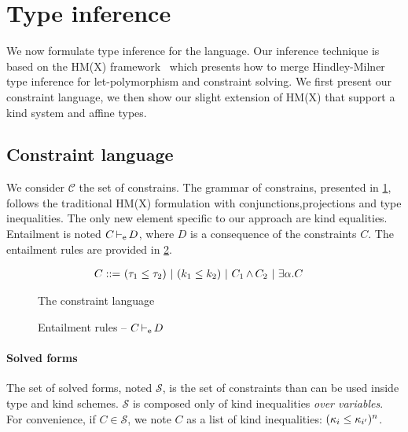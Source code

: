 \section{Type inference}

We now formulate type inference for the \lang language. Our inference technique is based on the HM(X) framework~\citep{DBLP:journals/tapos/OderskySW99} which
presents how to merge Hindley-Milner type inference for let-polymorphism and
constraint solving. We first present our constraint language, we then show
our slight extension of HM(X) that support a kind system and affine types.

\subsection{Constraint language}

We consider $\mathcal C$ the set of constrains.
The grammar of constrains, presented
in \cref{grammar:constraint}, follows the traditional HM(X) formulation
with conjunctions,projections and type inequalities. The only new
element specific to our approach are kind equalities.
Entailment is noted $C \operatorname{\vdash_e} D$, where $D$ is a consequence of the
constraints $C$. The entailment rules are provided in \cref{rules:entail}.

\begin{figure}[h]
  \centering
  \begin{align*}
    C ::=&\ (\tau_1 \leq \tau_2)\ |\ (k_1 \leq k_2)\ |\ C_1 \operatorname{\wedge} C_2\ |\ \exists \alpha.C
  \end{align*}
  \caption{The constraint language}
  \label{grammar:constraint}
\end{figure}

\begin{figure*}[h]
  
  \caption{Entailment rules -- $C \operatorname{\vdash_e} D$ }
  \label{rules:entail}
\end{figure*}


\paragraph{Solved forms}

The set of solved forms, noted $\mathcal S$,
is the set of constraints than can be used inside
type and kind schemes. $\mathcal S$ is composed only of kind
inequalities \emph{over variables}. For convenience, if $C\in\mathcal S$, we
note $C$ as a list of kind inequalities: $(\kappa_i \leq \kappa_{i'})^n$.


